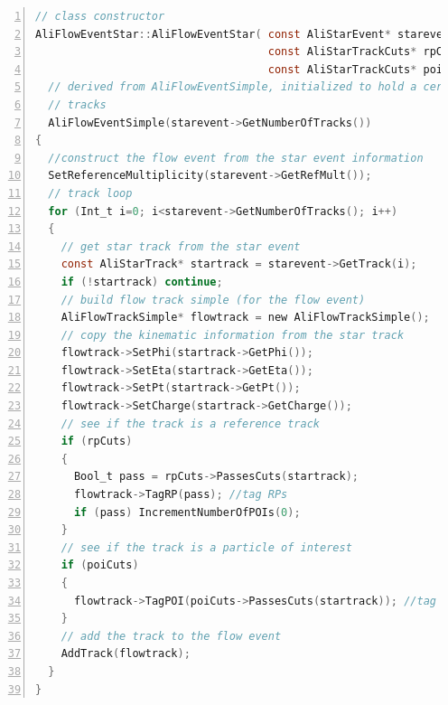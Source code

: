 \documentclass[a4paper]{book}
\numberwithin{equation}{subsection}
\begin{document}
\begin{lstlisting}[language=C, numbers=left]
// class constructor
AliFlowEventStar::AliFlowEventStar( const AliStarEvent* starevent,
                                    const AliStarTrackCuts* rpCuts,
                                    const AliStarTrackCuts* poiCuts ):
  // derived from AliFlowEventSimple, initialized to hold a certain number of 
  // tracks
  AliFlowEventSimple(starevent->GetNumberOfTracks())
{
  //construct the flow event from the star event information
  SetReferenceMultiplicity(starevent->GetRefMult());
  // track loop
  for (Int_t i=0; i<starevent->GetNumberOfTracks(); i++)
  {
    // get star track from the star event
    const AliStarTrack* startrack = starevent->GetTrack(i);
    if (!startrack) continue;
    // build flow track simple (for the flow event)
    AliFlowTrackSimple* flowtrack = new AliFlowTrackSimple();
    // copy the kinematic information from the star track
    flowtrack->SetPhi(startrack->GetPhi());
    flowtrack->SetEta(startrack->GetEta());
    flowtrack->SetPt(startrack->GetPt());
    flowtrack->SetCharge(startrack->GetCharge());
    // see if the track is a reference track
    if (rpCuts)
    {
      Bool_t pass = rpCuts->PassesCuts(startrack);
      flowtrack->TagRP(pass); //tag RPs
      if (pass) IncrementNumberOfPOIs(0);
    }
    // see if the track is a particle of interest
    if (poiCuts)
    {
      flowtrack->TagPOI(poiCuts->PassesCuts(startrack)); //tag POIs
    }
    // add the track to the flow event
    AddTrack(flowtrack);
  }
}\end{lstlisting}
\end{document}
